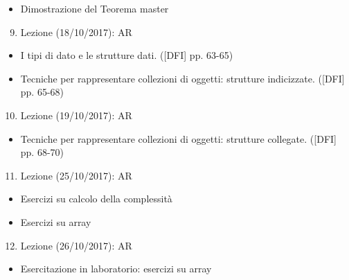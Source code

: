 \documentclass{article}
\providecommand{\tightlist}{%
  \setlength{\itemsep}{0pt}\setlength{\parskip}{0pt}}
\begin{document}
\begin{itemize}
\tightlist
\item
  {Dimostrazione del Teorema master}
\end{itemize}

\begin{enumerate}
\setcounter{enumi}{8}
\tightlist
\item
  {Lezione (18/10/2017): AR}
\end{enumerate}

\begin{itemize}
\tightlist
\item
  {I tipi di dato e le strutture dati. ({[}DFI{]} pp. 63-65)}
\item
  {Tecniche per rappresentare collezioni di oggetti: strutture
  indicizzate. ({[}DFI{]} pp. 65-68)}
\end{itemize}

\begin{enumerate}
\setcounter{enumi}{9}
\tightlist
\item
  {Lezione (19/10/2017): AR}
\end{enumerate}

\begin{itemize}
\tightlist
\item
  {Tecniche per rappresentare collezioni di oggetti: strutture
  collegate. ({[}DFI{]} pp. 68-70)}
\end{itemize}

\begin{enumerate}
\setcounter{enumi}{10}
\tightlist
\item
  {Lezione (25/10/2017): AR}
\end{enumerate}

\begin{itemize}
\tightlist
\item
  {Esercizi su calcolo della complessità}
\item
  {Esercizi su array}
\end{itemize}

\begin{enumerate}
\setcounter{enumi}{11}
\tightlist
\item
  {Lezione (26/10/2017): AR}
\end{enumerate}

\begin{itemize}
\tightlist
\item
  {Esercitazione in laboratorio: esercizi su array}
\end{itemize}
\end{document}
